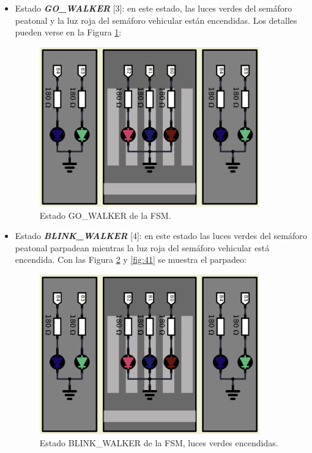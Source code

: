 \begin{itemize}
    \item Estado \textbf{\textit{GO\_WALKER}} [3]: en este estado, las luces verdes del semáforo peatonal y la luz roja del semáforo vehicular están encendidas. Los detalles pueden verse en la Figura \ref{fig:3}: 

    \begin{figure}[H]
    \centering
    \includegraphics[width=95mm]{./Figuras/Desarrollo_Analisis/3}
    \caption{Estado GO\_WALKER de la FSM.} 
    \label{fig:3}
    \end{figure}
    
    \item Estado \textbf{\textit{BLINK\_WALKER}} [4]: en este estado las luces verdes del semáforo peatonal parpadean mientras la luz roja del semáforo vehicular está encendida. Con las Figura \ref{fig:40} y \ref{fig:41} se muestra el parpadeo:

    \begin{figure}[H]
    \centering
    \includegraphics[width=95mm]{./Figuras/Desarrollo_Analisis/4_0}
    \caption{Estado BLINK\_WALKER de la FSM, luces verdes encendidas.} 
    \label{fig:40}
    \end{figure}


\end{itemize}
